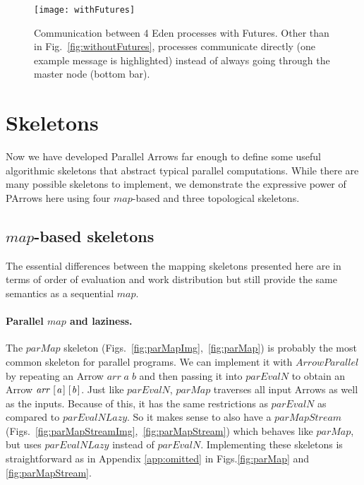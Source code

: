 \documentclass{jfp1}
\newcommand{\Conid}[1]{\mathit{#1}}
\newcommand{\Varid}[1]{\mathit{#1}}
\begin{document}
\begin{figure}[ht]
	\centering
	\texttt{[image: withFutures]}
	\caption[with Futures]{Communication between 4 Eden processes with Futures. Other than in Fig.~\ref{fig:withoutFutures}, processes communicate directly (one example message is highlighted) instead of always going through the master node (bottom bar).}
	\label{fig:withFutures}
\end{figure}
	\section{Skeletons}
\label{sec:skeletons}
Now we have developed Parallel Arrows far enough to define some useful algorithmic skeletons that abstract typical parallel computations. While there are many possible skeletons to implement, we demonstrate the expressive power of PArrows here using four \ensuremath{\Varid{map}}-based and three topological skeletons.
\subsection{\ensuremath{\Varid{map}}-based skeletons}
\label{sec:map-skeletons}
The essential differences between the mapping skeletons presented here are in terms of order of evaluation and work distribution but still provide the same semantics as a sequential \ensuremath{\Varid{map}}.

\paragraph{Parallel \ensuremath{\Varid{map}} and laziness.}
The \ensuremath{\Varid{parMap}} skeleton (Figs.~\ref{fig:parMapImg},~\ref{fig:parMap}) is probably the most common skeleton for parallel programs. We can implement it with \ensuremath{\Conid{ArrowParallel}} by repeating an Arrow \ensuremath{\Varid{arr}\;\Varid{a}\;\Varid{b}} and then passing it into \ensuremath{\Varid{parEvalN}} to obtain an Arrow \ensuremath{\Varid{arr}\;[\mskip1.5mu \Varid{a}\mskip1.5mu]\;[\mskip1.5mu \Varid{b}\mskip1.5mu]}.
Just like \ensuremath{\Varid{parEvalN}}, \ensuremath{\Varid{parMap}} traverses all input Arrows as well as the inputs.
Because of this, it has the same restrictions as \ensuremath{\Varid{parEvalN}} as compared to \ensuremath{\Varid{parEvalNLazy}}. So it makes sense to also have a \ensuremath{\Varid{parMapStream}} (Figs.~\ref{fig:parMapStreamImg},~\ref{fig:parMapStream}) which behaves like \ensuremath{\Varid{parMap}}, but uses \ensuremath{\Varid{parEvalNLazy}} instead of \ensuremath{\Varid{parEvalN}}. Implementing these skeletons is straightforward as in Appendix \ref{app:omitted} in Figs.\ref{fig:parMap} and \ref{fig:parMapStream}.
\end{document}
